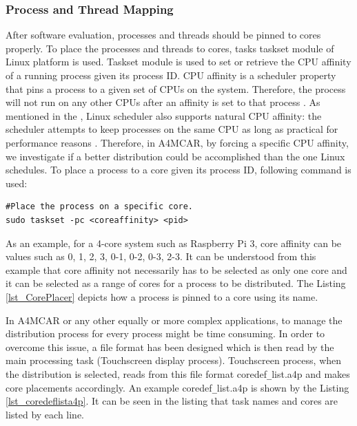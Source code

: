 \subsubsection{Process and Thread Mapping}
After software evaluation, processes and threads should be pinned to cores properly. To place the processes and threads to cores, tasks taskset module of Linux platform is used. Taskset module \cite{taskset} is used to set or retrieve the CPU affinity of a running process given its process ID. CPU affinity is a scheduler property that pins a process to a given set of CPUs on the system. Therefore, the process will not run on any other CPUs after an affinity is set to that process \cite{taskset}. As mentioned in the \cite{taskset}, Linux scheduler also supports natural CPU affinity: the scheduler attempts to keep processes on the same CPU as long as practical for performance reasons \cite{taskset}. Therefore, in A4MCAR, by forcing a specific CPU affinity, we investigate if a better distribution could be accomplished than the one Linux schedules. To place a process to a core given its process ID, following command is used:

\begin{lstlisting}
#Place the process on a specific core.
sudo taskset -pc <coreaffinity> <pid>
\end{lstlisting}

As an example, for a 4-core system such as Raspberry Pi 3, core affinity can be values such as 0, 1, 2, 3, 0-1, 0-2, 0-3, 2-3. It can be understood from this example that core affinity not necessarily has to be selected as only one core and it can be selected as a range of cores for a process to be distributed. The Listing \ref{lst_CorePlacer} depicts how a process is pinned to a core using its name.


In A4MCAR or any other equally or more complex applications, to manage the distribution process for every process might be time consuming. In order to overcome this issue, a file format has been designed which is then read by the main processing task (Touchscreen display process). Touchscreen process, when the distribution is selected, reads from this file format coredef\texttt{\_}list.a4p and makes core placements accordingly. An example coredef\texttt{\_}list.a4p is shown by the Listing \ref{lst_coredeflista4p}. It can be seen in the listing that task names and cores are listed by each line.


